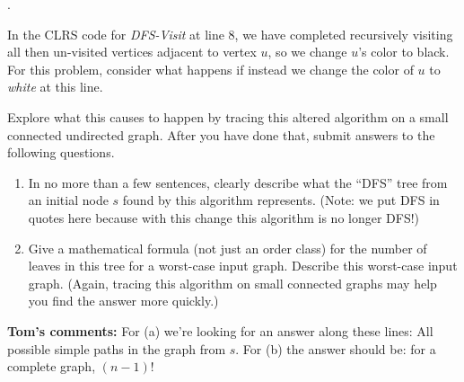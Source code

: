 \documentclass[12pt]{article}
\newcounter{quesnum}
\newcommand{\question}[2][??]{
\begin{list}{\labelitemi}{\leftmargin=2em}
\item [\arabic{quesnum}.] {#2}
\end{list}
\addtocounter{quesnum}{1}
}
\begin{document}

\question[1]{
In the CLRS code for {\em DFS-Visit} at line 8,  we have completed recursively visiting all then un-visited vertices adjacent to vertex $u$, so we change $u$'s color to black.  For this problem, consider what happens if instead we change the color of $u$ to {\em white} at this line.

Explore what this causes to happen by tracing this altered algorithm on a small connected undirected graph.  After you have done that, submit answers to the following questions.

\begin{enumerate}
\renewcommand{\theenumi}{\Alph{enumi}}
\item In no more than a few sentences, clearly describe what the ``DFS'' tree from an initial node $s$ found by this algorithm represents.  (Note:  we put DFS in quotes here because with this change this algorithm is no longer DFS!)
\item Give a mathematical formula (not just an order class) for the number of leaves in this tree for a worst-case input graph.  Describe this worst-case input graph.  (Again, tracing this algorithm on small connected graphs may help you find the answer more quickly.)
\end{enumerate}

 {\bf Tom's comments:}  For (a) we're looking for an answer along these lines:  All possible simple paths in the graph from $s$.  For (b) the answer should be: for a complete graph, $(n-1)!$

}
\end{document}
